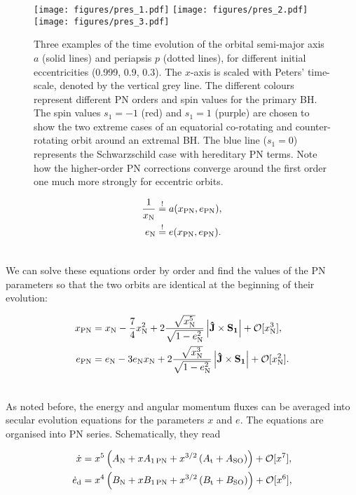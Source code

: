\documentclass[usenatbib]{mnras}
\begin{document}
\begin{figure*}
    \centering
    \texttt{[image: figures/pres\_1.pdf]}
    \texttt{[image: figures/pres\_2.pdf]}
    \texttt{[image: figures/pres\_3.pdf]}
    \caption{Three examples of the time evolution of the orbital semi-major axis $a$ (solid lines) and periapsis $p$ (dotted lines), for different initial eccentricities (0.999, 0.9, 0.3). The $x$-axis is scaled with Peters' time-scale, denoted by the vertical grey line. The different colours represent different PN orders and spin values for the primary BH. The spin values $s_1=-1$ (red) and $s_1=1$ (purple) are chosen to show the two extreme cases of an equatorial co-rotating and counter-rotating orbit around an extremal BH. The blue line ($s_1=0$) represents the Schwarzschild case with hereditary PN terms. Note how the higher-order PN corrections converge around the first order one much more strongly for eccentric orbits.}
    \label{fig:param}
\end{figure*}

\begin{align}
    \frac{1}{x_{\rm N}} &\overset{!}{=} a(x_{\rm{PN}},e_{\rm{PN}}), \\
    e_{\rm N} &\overset{!}{=} e(x_{\rm{PN}},e_{\rm{PN}}).\\ \nonumber
\end{align}

We can solve these equations order by order and find the values of the PN parameters so that the two orbits are identical at the beginning of their evolution:

\begin{align}
    x_{\rm{PN}} &= x_{\rm N} - \frac{7}{4}x_{\rm N}^2+ 2\frac{\sqrt{x_{\rm N}^5}}{\sqrt{1-e_{\rm N}^2}} \left\lvert \mathbf{\hat{J} \times S_1} \right\rvert + \mathcal{O}[x_{\rm N}^3], \label{eq:initialx} \\
    e_{\rm{PN}} &= e_{\rm N} - 3 e_{\rm N}x_{\rm N}+ 2\frac{\sqrt{x_{\rm N}^3}}{\sqrt{1-e_{\rm N}^2}} \left\lvert \mathbf{\hat{J} \times S_1} \right\rvert + \mathcal{O}[x_{\rm N}^2]. \label{eq:initiale}\\ \nonumber
\end{align}

As noted before, the energy and angular momentum fluxes can be averaged into secular evolution equations for the parameters $x$ and $e$. The equations are organised into PN series. Schematically, they read

\begin{align}
\dot{x} &= x^{5}\left(A_{\rm N} + xA_{\rm{1\,PN}} + x^{3/2} \left(A_{\rm{t}} + A_{\rm{SO}}\right) \right) + \mathcal{O}[x^7], \label{eq:dxdt} \\
\dot{e}_{\rm d} &= x^{4}\left(B_{\rm N} + xB_{\rm{1\,PN}} + x^{3/2} \left(B_{\rm{t}} + B_{\rm{SO}}\right) \right) +\mathcal{O}[x^6], \label{eq:dedt}\\ \nonumber
\end{align}
\end{document}
